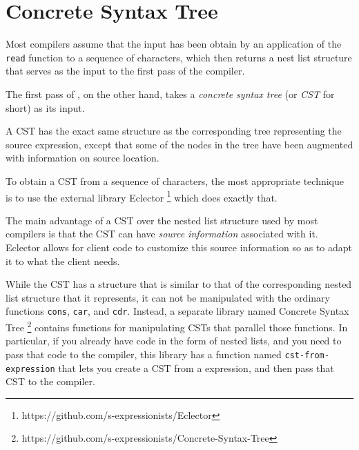 \chapter{Concrete Syntax Tree}

Most \commonlisp{} compilers assume that the input has been obtain by
an application of the \commonlisp{} \texttt{read} function to a
sequence of characters, which then returns a nest list structure that
serves as the input to the first pass of the compiler.

The first pass of \sysname{}, on the other hand, takes a
\emph{concrete syntax tree} (or \emph{CST} for short) as its input.  

A CST has the exact same structure as the corresponding tree
representing the source expression, except that some of the nodes in
the tree have been augmented with information on source location.

To obtain a CST from a sequence of characters, the most appropriate
technique is to use the external library
Eclector%
\footnote{https://github.com/s-expressionists/Eclector}
which does exactly that.

The main advantage of a CST over the nested list structure used by
most compilers is that the CST can have \emph{source information}
associated with it.  Eclector allows for client code to customize this
source information so as to adapt it to what the client needs.

While the CST has a structure that is similar to that of the
corresponding nested list structure that it represents, it can not be
manipulated with the ordinary \commonlisp{} functions \texttt{cons},
\texttt{car}, and \texttt{cdr}.  Instead, a separate library named
Concrete Syntax Tree%
\footnote{https://github.com/s-expressionists/Concrete-Syntax-Tree}
contains functions for manipulating CSTs that parallel those
\commonlisp{} functions.  In particular, if you already have
\commonlisp{} code in the form of nested lists, and you need to pass
that code to the compiler, this library has a function named
\texttt{cst-from-expression} that lets you create a CST from a
\commonlisp{} expression, and then pass that CST to the compiler.
